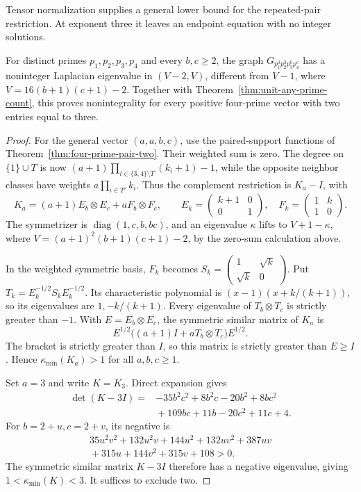 Tensor normalization supplies a general lower bound for the
repeated-pair restriction. At exponent three it leaves an endpoint
equation with no integer solutions.

\begin{theorem}
\label{thm:four-prime-pair-three}
For distinct primes $p_1,p_2,p_3,p_4$ and every $b,c\geq2$, the graph
$G_{p_1^3p_2^3p_3^bp_4^c}$ has a noninteger Laplacian eigenvalue in
$(V-2,V)$, different from $V-1$, where $V=16(b+1)(c+1)-2$.
Together with Theorem~\ref{thm:unit-any-prime-count}, this proves
nonintegrality for every positive four-prime vector with two entries
equal to three.
\end{theorem}
\begin{proof}
For the general vector $(a,a,b,c)$, use the paired-support functions
of Theorem~\ref{thm:four-prime-pair-two}. Their weighted sum is zero.
The degree on $\{1\}\cup T$ is now
$(a+1)\prod_{i\in\{3,4\}\setminus T}(k_i+1)-1$, while the opposite
neighbor classes have weights $a\prod_{i\in T'}k_i$.
Thus the complement restriction is $K_a-I$, with
\[
 K_a=(a+1)E_b\otimes E_c+aF_b\otimes F_c,\qquad
 E_k=\begin{pmatrix}k+1&0\\0&1\end{pmatrix},\quad
 F_k=\begin{pmatrix}1&k\\1&0\end{pmatrix}.
\]
The symmetrizer is $\operatorname{diag}(1,c,b,bc)$, and an eigenvalue
$\kappa$ lifts to $V+1-\kappa$, where
$V=(a+1)^2(b+1)(c+1)-2$, by the zero-sum calculation above.

In the weighted symmetric basis, $F_k$ becomes
$S_k=\begin{pmatrix}1&\sqrt{k}\\\sqrt{k}&0\end{pmatrix}$.
Put $T_k=E_k^{-1/2}S_kE_k^{-1/2}$. Its characteristic polynomial
is $(x-1)(x+k/(k+1))$, so its eigenvalues are $1,-k/(k+1)$.
Every eigenvalue of $T_b\otimes T_c$ is strictly greater than $-1$.
With $E=E_b\otimes E_c$, the symmetric similar matrix of $K_a$ is
\[
 E^{1/2}\bigl((a+1)I+aT_b\otimes T_c\bigr)E^{1/2}.
\]
The bracket is strictly greater than $I$, so this matrix is strictly
greater than $E\geq I$. Hence $\kappa_{\min}(K_a)>1$ for all
$a,b,c\geq1$.

Set $a=3$ and write $K=K_3$. Direct expansion gives
\begin{align*}
\det(K-3I)={}&-35b^2c^2+8b^2c-20b^2+8bc^2\\
             &{}+109bc+11b-20c^2+11c+4.
\end{align*}
For $b=2+u,c=2+v$, its negative is
\begin{align*}
35u^2v^2+132u^2v+144u^2+132uv^2+387uv\\
{}+315u+144v^2+315v+108>0.
\end{align*}
The symmetric similar matrix $K-3I$ therefore has a negative
eigenvalue, giving $1<\kappa_{\min}(K)<3$. It suffices to exclude two.


\end{proof}
